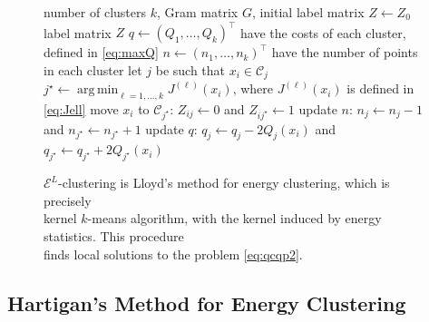 \documentclass[aps,preprint,nofootinbib,floatfix]{revtex4-1}
\DeclareMathOperator*{\argmin}{arg\,min}
\newcommand\C{{\mathcal{C}}}
\begin{document}
\begin{figure}
\begin{flushleft}
\begin{algorithm}[H]
\vspace{.5em}
\begin{algorithmic}[1]
    \INPUT number of clusters $k$, Gram matrix $G$, initial label
    matrix $Z \leftarrow Z_0$
    \OUTPUT label matrix $Z$ 
  \STATE $q \leftarrow (Q_1, \dotsc, Q_k)^\top$ 
            have the costs of each cluster, defined in \eqref{eq:maxQ}
  \STATE $n \leftarrow (n_1,\dotsc,n_k)^\top$ 
        have the number of points in each cluster%
  \REPEAT
        \STATE let $j$ be such that $x_i \in \C_j$
        \STATE $j^\star \leftarrow \argmin_{\ell=1,\dotsc,k} J^{(\ell)}(x_i)$,
            where $J^{(\ell)}(x_i)$ is defined in \eqref{eq:Jell}
            \STATE move $x_i$ to $\C_{j^\star}$: $Z_{ij} \leftarrow 0$ and
            $Z_{ij^\star} \leftarrow 1$
            \STATE update $n$: $n_j \leftarrow n_j - 1$ and
                    $n_{j^\star} \leftarrow n_{j^\star} + 1$
            \STATE update $q$: $q_j \leftarrow q_j - 2Q_j(x_i)$ and
    $q_{j^\star} \leftarrow q_{j^\star} + 2Q_{j^\star}(x_i)$
        \ENDIF
    \ENDFOR
\end{algorithmic}
\caption{\label{kmeans_algo}
$\mathcal{E}^{L}$-clustering is Lloyd's method for energy clustering, which
is precisely~~~~~~~~~ \\
kernel $k$-means algorithm, with the kernel induced by energy statistics. 
This procedure~~~~~~~ \\
finds
local solutions to the problem \eqref{eq:qcqp2}.\hspace{\fill}
}
\end{algorithm}
\end{flushleft}
\end{figure}

\subsection*{Hartigan's Method for Energy Clustering}
\end{document}

